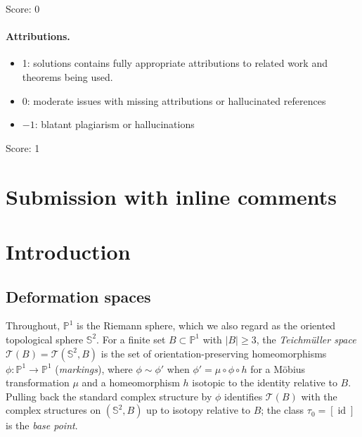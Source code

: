 \documentclass[11pt]{article}
\newcommand{\Pone}{\mathbb P^1}
\newcommand{\Sph}{\mathbb S^2}
\newcommand{\Z}{\mathbb Z}
\newcommand{\Teich}{\mathcal T}
\newcommand{\D}{\mathcal D}
\newcommand{\id}{\operatorname{id}}
\theoremstyle{remark}
\numberwithin{equation}{section}
\begin{document}
\noindent Score: 0

\paragraph{Attributions.}
\begin{itemize}
	\item  1: solutions contains fully appropriate attributions
		to related work and theorems being used.
	\item  0: moderate issues with missing attributions or hallucinated references
	\item  $-1$: blatant plagiarism or hallucinations
\end{itemize}

\noindent Score: 1

\newpage
\section{Submission with inline comments}


\begin{abstract}
Let $f$ be a quadratic rational map one of whose critical points lies in a
cycle $A$ of length four and whose other critical value $v$ lies outside
$A$, and let $B=A\cup\{v\}$. Epstein's deformation space $\D_f\subset\Teich(\Sph,B)$ is
known to be disconnected (Hironaka--Koch). We write down an explicit simple
closed curve $\gamma$ on $(\Sph,B)$, for a normalized model map the image
of a round circle under two Dehn twists about a second round circle,
transported to a general $f$ along a path in parameter space, and prove
that the Dehn twist $T_\gamma$ itself preserves $\D_f$ and that the
translates $T_\gamma^n(D_0)$, $n\in\Z$, of the base component $D_0$ are
pairwise distinct components, using the covering-space framework of
Hironaka--Koch and a winding-number obstruction.
\end{abstract}

\section{Introduction}

\subsection{Deformation spaces}\label{sec:defspaces}

Throughout, $\Pone$ is the Riemann sphere, which we also regard as the
oriented topological sphere $\Sph$. For a finite set $B\subset\Pone$ with
$|B|\ge3$, the \emph{Teichm\"uller space} $\Teich(B)=\Teich(\Sph,B)$ is the
set of orientation-preserving homeomorphisms $\phi\colon\Pone\to\Pone$
(\emph{markings}), where $\phi\sim\phi'$ when $\phi'=\mu\circ\phi\circ h$
for a M\"obius transformation $\mu$ and a homeomorphism $h$ isotopic to the
identity relative to $B$. Pulling back the standard complex structure by
$\phi$ identifies $\Teich(B)$ with the complex structures on $(\Sph,B)$ up
to isotopy relative to $B$; the class $\tau_0=[\id]$ is the \emph{base
point}.
\end{document}
